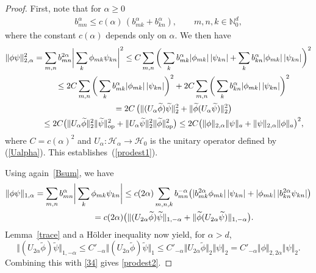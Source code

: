 \documentclass[11pt]{article}
\begin{document}
\begin{proof}
First, note that for $\alpha\geq 0$
\begin{gather}
\label{Bsum}
b_{mn}^\alpha\leq c(\alpha)\,(b_{mk}^\alpha+b_{kn}^\alpha) ,
\qquad  m,n,k\in\mathbb N_0^d,
\end{gather}
where the constant $c(\alpha)$ depends only on $\alpha$.
We then have
\begin{gather*}
\Vert\phi \psi\Vert_{2,\alpha}^2 =\sum_{m,n}b^{2\alpha}_{mn}\bigg|\sum_k\phi_{mk}
\psi_{kn}\bigg|^2
 \leq
C\sum_{m,n}\bigg(\sum_kb^{\alpha}_{mk} |\phi_{mk}| \, |\psi_{kn}|
+\sum_kb^{\alpha}_{kn} |\phi_{mk}|\,|\psi_{kn}|\bigg)^2\\
\hphantom{\Vert\phi \psi\Vert_{2,\alpha}^2}{}
\leq
2C\sum_{m,n}\bigg(\sum_kb^{\alpha}_{mk} |\phi_{mk}|\,|\psi_{kn}|\bigg)^2
+2C\sum_{m,n}\bigg(\sum_kb^{\alpha}_{kn} |\phi_{mk}|\,|\psi_{kn}|\bigg)^2\\
\hphantom{\Vert\phi \psi\Vert_{2,\alpha}^2}{}
=2C\,\big(\Vert(U_{\alpha}\widetilde\phi) \widetilde\psi\Vert_2^2+
\Vert\widetilde\phi (U_{\alpha}\widetilde\psi)\Vert_2^2\big)\\
\hphantom{\Vert\phi \psi\Vert_{2,\alpha}^2}{}
\leq 2C \big(\Vert U_{\alpha}\widetilde\phi\Vert_2^2
\Vert\widetilde\psi\Vert_{\rm op}^2+
\Vert U_\alpha\widetilde\psi\Vert_2^2
\Vert\widetilde\phi\Vert_{\rm op}^2\big)
 \leq 2C \big(\Vert\phi\Vert_{2,\alpha}
\Vert\psi\Vert_a+\Vert\psi\Vert_{2,\alpha} \Vert\phi\Vert_a\big)^2 ,
\end{gather*}
where  $C= c(\alpha)^2$ and $U_\alpha:\mathcal H_\alpha\to\mathcal H_0$ is
the unitary operator def\/ined by (\ref{Ualpha}). This establishes~(\ref{prodest1}).

Using again~\eqref{Bsum}, we have
\begin{gather}
\Vert\phi \psi\Vert_{1,\alpha} =\sum_{m,n}b^\alpha_{mn}\bigg|\sum_k\phi_{mk}
\psi_{kn}\bigg| \leq
c(2\alpha)\sum_{m,n,k}b^{-\alpha}_{mn}\big(|b^{2\alpha}_{mk} \phi_{mk}|\,
|\psi_{kn}|+|\phi_{mk}|\,|b^{2\alpha}_{kn} \psi_{kn}|\big)\nonumber\\
\hphantom{\Vert\phi \psi\Vert_{1,\alpha}}{}
=c(2\alpha)\big(\Vert(U_{2\alpha}\widetilde\phi) \widetilde\psi\Vert_{1,-\alpha}+
\Vert\widetilde\phi (U_{2\alpha}\widetilde\psi)\Vert_{1,-\alpha}\big) .\label{34}
\end{gather}
 Lemma~\ref{trace} and a H\"older inequality now yield, for $\alpha>d$,
\[
\Vert(U_{2\alpha}\widetilde\phi) \widetilde\psi\Vert_{1,-\alpha}
\leq C'_{-\alpha}\Vert(U_{2\alpha}\widetilde\phi) \widetilde\psi\Vert_1
\leq C'_{-\alpha}\Vert U_{2\alpha}\widetilde\phi\Vert_2\Vert\psi\Vert_2
= C'_{-\alpha}\Vert\phi\Vert_{2,2\alpha}\Vert\psi\Vert_2 .
\]
Combining this with \eqref{34} gives \eqref{prodest2}.
\end{proof}
\end{document}
